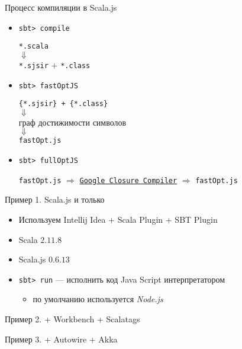 \begin{frame}{Процесс компиляции в Scala.js}
	\begin{itemize}
		\item[] \alert{\texttt{sbt> compile}}
		\begin{center}
		\begin{small}
			\texttt{*.scala}\\ 
			$\Downarrow$ \\ 
			\texttt{*.sjsir} $+$ \texttt{*.class}
		\end{small}
		\end{center}
		\item[] \alert{\texttt{sbt> fastOptJS}}
		\begin{center}
		\begin{small}
			\texttt{\{*.sjsir\} + \{*.class\}}  \\ 
            $\Downarrow$ \\
            граф достижимости символов \\
            $\Downarrow$ \\
            \texttt{fastOpt.js}
        \end{small}
		\end{center}
		\item[] \alert{\texttt{sbt> fullOptJS}}
		\begin{center}
		\begin{small}
			\texttt{fastOpt.js} $\Rightarrow$ \texttt{\href{https://github.com/google/closure-compiler}{Google Closure Compiler}} $\Rightarrow$ \texttt{fastOpt.js}
        \end{small}
		\end{center}
	\end{itemize}
\end{frame}

\begin{frame}{Пример 1. Scala.js и только}
\begin{itemize}
	\item Используем \alert{Intellij Idea} $+$ \alert{Scala Plugin} $+$ \alert{SBT Plugin}
	\item Scala $2.11.8$
	\item Scala.js $0.6.13$
\end{itemize}
\begin{itemize}
	\item \alert{\texttt{sbt> run}} --- исполнить код Java Script интерпретатором
	\begin{itemize}
		\item по умолчанию используется \emph{Node.js}
	\end{itemize}
\end{itemize}
\end{frame}

\begin{frame}{Пример 2. + Workbench + Scalatags}
\end{frame}

\begin{frame}{Пример 3. + Autowire + Akka}
\end{frame}


